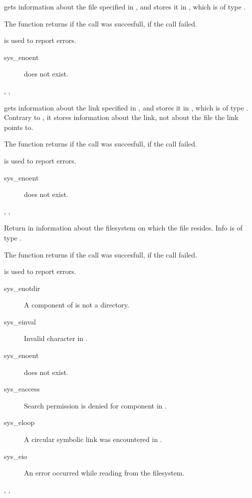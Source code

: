 

{
 gets information about the file specified in , and stores it in 
, which is of type .

The function returns  if the call was succesfull,  if the call
failed.
}
{  is used to report errors.
\begin{description}
\item[sys\_enoent]  does not exist.
\end{description}
}
{, , }



{
 gets information about the link specified in , and stores it in 
, which is of type . Contrary to , it stores
information about the link, not about the file the link points to.

The function returns  if the call was succesfull,  if the call
failed.
}
{  is used to report errors.
\begin{description}
\item[sys\_enoent]  does not exist.
\end{description}
}
{, , }



{ Return in  information about the filesystem on which the file
 resides. Info is of type .

The function returns  if the call was succesfull,  if the call
failed.
}
{  is used to report errors.
\begin{description}
\item[sys\_enotdir] A component of  is not a directory.
\item[sys\_einval] Invalid character in .
\item[sys\_enoent]  does not exist.
\item[sys\_eaccess] Search permission is denied for  component in
.
\item[sys\_eloop] A circular symbolic link was encountered in .
\item[sys\_eio] An error occurred while reading from the filesystem.
\end{description}
}
{, , }

